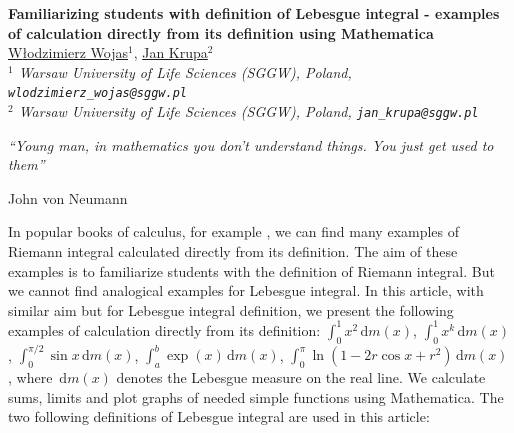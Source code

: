 \documentclass[11pt]{article}
\theoremstyle{definition}
\theoremstyle{definition}
\newcommand{\ds}{\displaystyle}
\newcommand{\dx}{\,\mathrm{d}}
\begin{document}
%





\vspace{-0.8cm}
\begin{flushleft}
\Large \textbf{\noindent
Familiarizing students with definition of Lebesgue integral  - examples of calculation directly from its definition using Mathematica}
\\
\vspace{0.5cm}
\normalsize
\normalsize{
\underline{ W{\l}odzimierz Wojas$^1$}, \underline{Jan Krupa}$^2$
} \\
\vspace{5mm}
\textit{\footnotesize
$^1$ Warsaw University of Life Sciences (SGGW), Poland, {\tt wlodzimierz\_wojas@sggw.pl}\\
$^2$ Warsaw University of Life Sciences (SGGW), Poland, {\tt jan\_krupa@sggw.pl}\\
}
\end{flushleft}

\epigraph{\textit{``Young man, in mathematics you don't understand things. You just get used to them''}}{John von Neumann}


In popular books of calculus, for example \cite{Apostol, Ficht}, we can find many examples of Riemann integral calculated directly from its definition. The aim of these examples is to familiarize students with the definition of Riemann integral. But we cannot find analogical examples for Lebesgue integral. In this article, with similar aim but for Lebesgue integral definition,  we present the following examples of calculation directly from its definition: $\ds \int_0^1 x^2 \dx m(x)$, $\ds \int_0^1 x^k \dx m(x)$, $\ds \int_0^{\pi/2} \sin x \dx m(x)$, $\ds \int_a^b \exp(x) \dx m(x)$, $\ds \int_0^{\pi}\ln(1-2r \cos x+r^2) \dx m(x)$, where $\ds \dx m(x)$ denotes the Lebesgue measure on the real line. We calculate sums, limits and plot graphs of needed simple functions using Mathematica.  The two following definitions of Lebesgue integral are used in this article:
\end{document}
